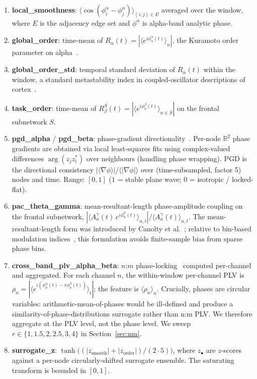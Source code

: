 \documentclass[11pt,a4paper]{article}
\begin{document}
\begin{enumerate}\itemsep0pt
\item \textbf{local\_smoothness}: $\langle\cos(\phi^{\alpha}_i-\phi^{\alpha}_j)\rangle_{(i,j)\in E}$ averaged over the window, where $E$ is the adjacency edge set and $\phi^{\alpha}$ is alpha-band analytic phase.
\item \textbf{global\_order}: time-mean of $R_{\alpha}(t)=|\langle e^{i\phi^{\alpha}_n(t)}\rangle_n|$, the Kuramoto order parameter on alpha~\cite{kuramoto1984chemical}.
\item \textbf{global\_order\_std}: temporal standard deviation of $R_\alpha(t)$ within the window, a standard metastability index in coupled-oscillator descriptions of cortex~\cite{deco2016metastability}.
\item \textbf{task\_order}: time-mean of $R_{\beta}^{S}(t)=|\langle e^{i\phi^{\beta}_n(t)}\rangle_{n\in S}|$ on the frontal subnetwork $S$.
\item \textbf{pgd\_alpha} / \textbf{pgd\_beta}: phase-gradient directionality~\cite{rubino2006propagating,muller2018cortical}. Per-node $\mathbb{R}^2$ phase gradients are obtained via local least-squares fits using complex-valued differences $\arg(z_j z_i^*)$ over neighbours (handling phase wrapping). PGD is the directional consistency $|\langle\nabla\phi\rangle|/\langle|\nabla\phi|\rangle$ over (time-subsampled, factor 5) nodes and time. Range: $[0,1]$ ($1$ = stable plane wave; $0$ = isotropic / locked-flat).
\item \textbf{pac\_theta\_gamma}: mean-resultant-length phase-amplitude coupling on the frontal subnetwork, $|\langle A^{\gamma}_n(t)\,e^{i\phi^{\theta}_n(t)}\rangle_{n,t}|/\langle A^{\gamma}_n(t)\rangle_{n,t}$. The mean-resultant-length form was introduced by Canolty et al.~\cite{canolty2006high}; relative to bin-based modulation indices~\cite{tort2010measuring}, this formulation avoids finite-sample bias from sparse phase bins.
\item \textbf{cross\_band\_plv\_alpha\_beta}: $n$:$m$ phase-locking~\cite{tass1998detection} computed per-channel and aggregated. For each channel $n$, the within-window per-channel PLV is $\rho_n = |\langle e^{i(\phi^{\alpha}_n(t)-r\phi^{\beta}_n(t))}\rangle_t|$; the feature is $\langle\rho_n\rangle_n$. Crucially, phases are circular variables: arithmetic-mean-of-phases would be ill-defined and produce a similarity-of-phase-distributions surrogate rather than n:m PLV. We therefore aggregate at the PLV level, not the phase level. We sweep $r\in\{1,1.5,2,2.5,3,4\}$ in Section~\ref{sec:nm}.
\item \textbf{surrogate\_z}: $\tanh\!\big((|z_{\text{smooth}}|+|z_{\text{order}}|)/(2\cdot 5)\big)$, where $z_{\bullet}$ are $z$-scores against a per-node circularly-shifted surrogate ensemble. The saturating transform is bounded in $[0,1]$.
\end{enumerate}
\end{document}
